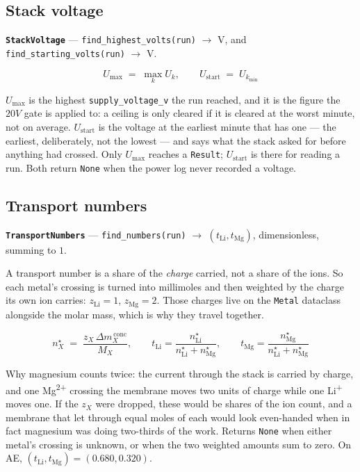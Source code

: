 \subsection{Stack voltage}

\textbf{\texttt{StackVoltage}} --- \texttt{find\_highest\_volts(run)} $\rightarrow$ V, and
\texttt{find\_starting\_volts(run)} $\rightarrow$ V.

\begin{equation}
  U_\mathrm{max} \;=\; \max_k U_k,
  \qquad
  U_\mathrm{start} \;=\; U_{k_\mathrm{min}}
  \label{eq:voltage}
\end{equation}

$U_\mathrm{max}$ is the highest \texttt{supply\_voltage\_v} the run reached, and it is the figure
the $20\unit{V}$ gate is applied to: a ceiling is only cleared if it is cleared at the worst
minute, not on average. $U_\mathrm{start}$ is the voltage at the earliest minute that has one ---
the earliest, deliberately, not the lowest --- and says what the stack asked for before anything
had crossed. Only $U_\mathrm{max}$ reaches a \texttt{Result}; $U_\mathrm{start}$ is there for
reading a run. Both return \texttt{None} when the power log never recorded a voltage.

\subsection{Transport numbers}

\textbf{\texttt{TransportNumbers}} --- \texttt{find\_numbers(run)} $\rightarrow$
$(t_\mathrm{Li}, t_\mathrm{Mg})$, dimensionless, summing to $1$.

A transport number is a share of the \emph{charge} carried, not a share of the ions. So each
metal's crossing is turned into millimoles and then weighted by the charge its own ion carries:
$z_\mathrm{Li} = 1$, $z_\mathrm{Mg} = 2$. Those charges live on the \texttt{Metal} dataclass
alongside the molar mass, which is why they travel together.

\begin{equation}
  n^\star_X \;=\; \frac{z_X\,\Delta m_X^{\,\mathrm{conc}}}{M_X},
  \qquad
  t_\mathrm{Li} = \frac{n^\star_\mathrm{Li}}{n^\star_\mathrm{Li} + n^\star_\mathrm{Mg}},
  \qquad
  t_\mathrm{Mg} = \frac{n^\star_\mathrm{Mg}}{n^\star_\mathrm{Li} + n^\star_\mathrm{Mg}}
  \label{eq:transport}
\end{equation}

Why magnesium counts twice: the current through the stack is carried by charge, and one
Mg\textsuperscript{2+} crossing the membrane moves two units of charge while one
Li\textsuperscript{+} moves one. If the $z_X$ were dropped, these would be shares of the ion
count, and a membrane that let through equal moles of each would look even-handed when in fact
magnesium was doing two-thirds of the work. Returns \texttt{None} when either metal's crossing is
unknown, or when the two weighted amounts sum to zero. On AE,
$(t_\mathrm{Li}, t_\mathrm{Mg}) = (0.680, 0.320)$.

